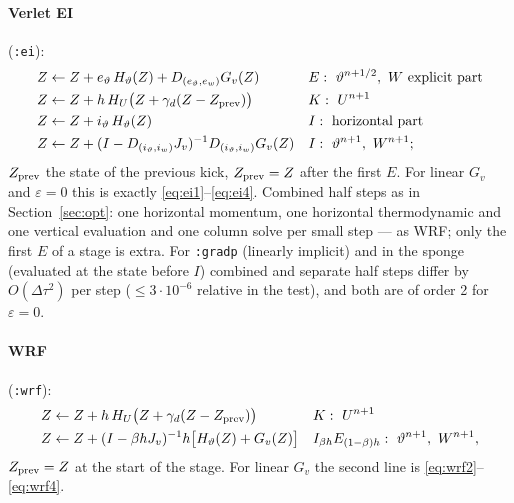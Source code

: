 \documentclass[11pt,a4paper]{article}
\newcommand{\dtau}{\Delta\tau}
\newcommand{\code}[1]{\texttt{\small #1}}
\newcommand{\tv}{\vartheta}   %
\begin{document}
\paragraph{Verlet EI} (\code{:ei}):
\begin{align*}
Z&\leftarrow Z+e_\tv\,H_\tv(Z)+D_{(e_\tv,e_w)}G_v(Z) &&E:\ \tv^{n+1/2},\ W\text{ explicit part}\\
Z&\leftarrow Z+h\,H_U\big(Z+\gamma_d(Z-Z_{\rm prev})\big) &&K:\ U^{n+1}\\
Z&\leftarrow Z+i_\tv\,H_\tv(Z) &&I:\ \text{horizontal part}\\
Z&\leftarrow Z+(I-D_{(i_\tv,i_w)}J_v)^{-1}D_{(i_\tv,i_w)}G_v(Z) &&I:\ \tv^{n+1},\ W^{n+1};
\end{align*}
$Z_{\rm prev}$ the state of the previous kick, $Z_{\rm prev}=Z$ after the first $E$. For linear $G_v$ and
$\varepsilon=0$ this is exactly \eqref{eq:ei1}--\eqref{eq:ei4}. Combined half steps as in Section~\ref{sec:opt}: one
horizontal momentum, one horizontal thermodynamic and one vertical evaluation and one column solve per
small step --- as WRF; only the first $E$ of a stage is extra. For \code{:gradp} (linearly implicit) and in the
sponge (evaluated at the state before $I$) combined and separate half steps differ by $O(\dtau^2)$ per step
($\le3\cdot10^{-6}$ relative in the test), and both are of order 2 for $\varepsilon=0$.

\paragraph{WRF} (\code{:wrf}):
\begin{align*}
Z&\leftarrow Z+h\,H_U\big(Z+\gamma_d(Z-Z_{\rm prev})\big) &&K:\ U^{n+1}\\
Z&\leftarrow Z+(I-\beta hJ_v)^{-1}h\big[H_\tv(Z)+G_v(Z)\big] &&I_{\beta h}E_{(1-\beta)h}:\ \tv^{n+1},\ W^{n+1},
\end{align*}
$Z_{\rm prev}=Z$ at the start of the stage. For linear $G_v$ the second line is
\eqref{eq:wrf2}--\eqref{eq:wrf4}.
\end{document}
